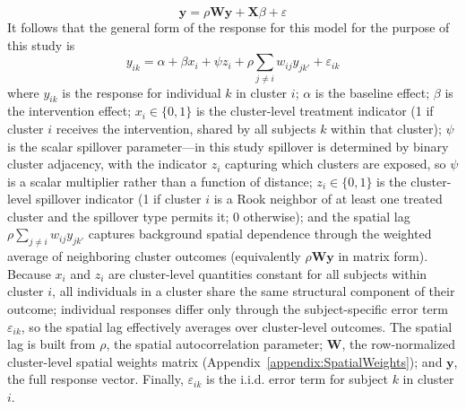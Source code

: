 \documentclass{article}[11pt]
\begin{document}
\begin{equation}
    \mathbf{y} = \rho\mathbf{Wy}+\mathbf{X}\beta + \varepsilon
\end{equation}
It follows that the general form of the response for this model for the purpose of this study is
\begin{equation}
    y_{ik} = \alpha + \beta x_i + \psi z_i + \rho\sum_{j \neq i} w_{ij} y_{jk'} + \varepsilon_{ik}
\end{equation}
where $y_{ik}$ is the response for individual $k$ in cluster $i$; $\alpha$ is the baseline effect; $\beta$ is the intervention effect; $x_i \in \{0,1\}$ is the cluster-level treatment indicator (1 if cluster $i$ receives the intervention, shared by all subjects $k$ within that cluster); $\psi$ is the scalar spillover parameter---in this study spillover is determined by binary cluster adjacency, with the indicator $z_i$ capturing which clusters are exposed, so $\psi$ is a scalar multiplier rather than a function of distance; $z_i \in \{0,1\}$ is the cluster-level spillover indicator (1 if cluster $i$ is a Rook neighbor of at least one treated cluster and the spillover type permits it; 0 otherwise); and the spatial lag $\rho\sum_{j \neq i} w_{ij} y_{jk'}$ captures background spatial dependence through the weighted average of neighboring cluster outcomes (equivalently $\rho\mathbf{Wy}$ in matrix form). Because $x_i$ and $z_i$ are cluster-level quantities constant for all subjects within cluster $i$, all individuals in a cluster share the same structural component of their outcome; individual responses differ only through the subject-specific error term $\varepsilon_{ik}$, so the spatial lag effectively averages over cluster-level outcomes. The spatial lag is built from $\rho$, the spatial autocorrelation parameter; $\mathbf{W}$, the row-normalized cluster-level spatial weights matrix (Appendix~\ref{appendix:SpatialWeights}); and $\mathbf{y}$, the full response vector. Finally, $\varepsilon_{ik}$ is the i.i.d. error term for subject $k$ in cluster $i$.
\end{document}
